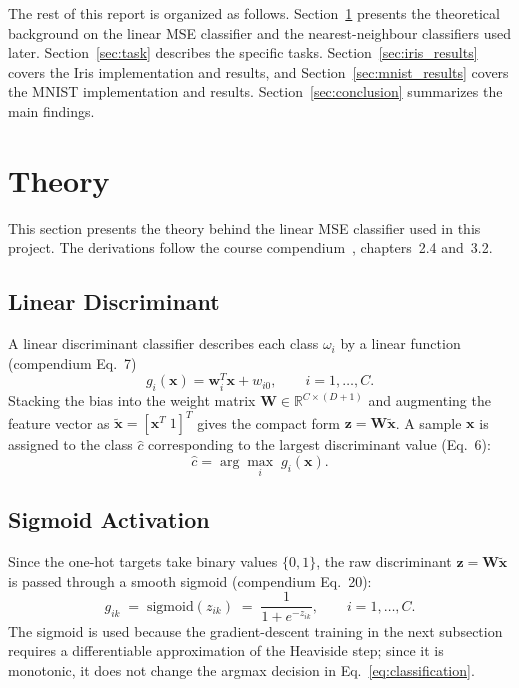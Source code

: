 \documentclass[11pt,a4paper]{article}
\begin{document}
The rest of this report is organized as follows. Section~\ref{sec:theory} presents the theoretical background on the linear MSE classifier and the nearest-neighbour classifiers used later. Section~\ref{sec:task} describes the specific tasks. Section~\ref{sec:iris_results} covers the Iris implementation and results, and Section~\ref{sec:mnist_results} covers the MNIST implementation and results. Section~\ref{sec:conclusion} summarizes the main findings.

\section{Theory}
\label{sec:theory}

This section presents the theory behind the linear MSE classifier used in this project. The derivations follow the course compendium~\cite{compendium}, chapters~2.4 and~3.2.

\subsection{Linear Discriminant}

A linear discriminant classifier describes each class $\omega_i$ by a linear function (compendium Eq.~7)
\begin{equation}
    g_i(\mathbf{x}) = \mathbf{w}_i^T \mathbf{x} + w_{i0}, \qquad i = 1,\dots,C.
    \label{eq:discriminant}
\end{equation}
Stacking the bias into the weight matrix $\mathbf{W} \in \mathbb{R}^{C \times (D+1)}$ and augmenting the feature vector as $\tilde{\mathbf{x}} = [\mathbf{x}^T\; 1]^T$ gives the compact form $\mathbf{z} = \mathbf{W}\tilde{\mathbf{x}}$. A sample $\mathbf{x}$ is assigned to the class $\hat{c}$ corresponding to the largest discriminant value (Eq.~6):
\begin{equation}
    \hat{c} = \arg\max_{i}\; g_i(\mathbf{x}).
    \label{eq:classification}
\end{equation}

\subsection{Sigmoid Activation}

Since the one-hot targets take binary values $\{0,1\}$, the raw discriminant $\mathbf{z} = \mathbf{W}\tilde{\mathbf{x}}$ is passed through a smooth sigmoid (compendium Eq.~20):
\begin{equation}
    g_{ik} \;=\; \mathrm{sigmoid}(z_{ik}) \;=\; \frac{1}{1+e^{-z_{ik}}}, \qquad i=1,\dots,C.
    \label{eq:sigmoid}
\end{equation}
The sigmoid is used because the gradient-descent training in the next subsection requires a differentiable approximation of the Heaviside step; since it is monotonic, it does not change the argmax decision in Eq.~\eqref{eq:classification}.
\end{document}
